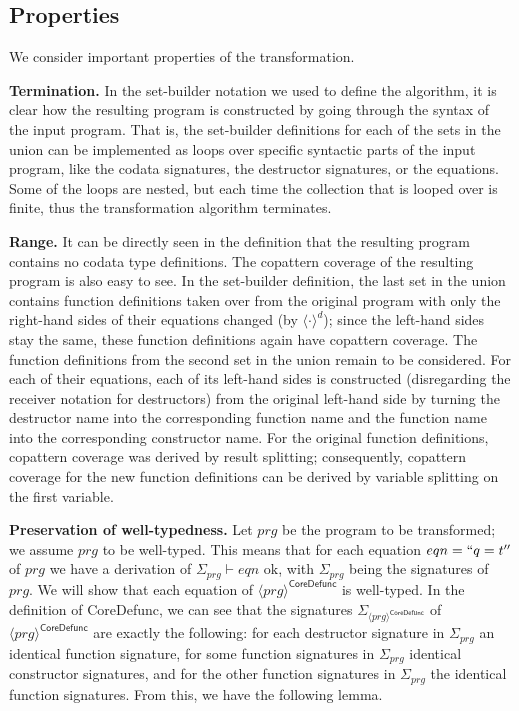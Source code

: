 \subsection{Properties}

We consider important properties of the transformation.

\textbf{Termination.} In the set-builder notation we used to define the algorithm, it is clear how the resulting program is constructed by going through the syntax of the input program. That is, the set-builder definitions for each of the sets in the union can be implemented as loops over specific syntactic parts of the input program, like the codata signatures, the destructor signatures, or the equations. Some of the loops are nested, but each time the collection that is looped over is finite, thus the transformation algorithm terminates.

\textbf{Range.} It can be directly seen in the definition that the resulting program contains no codata type definitions. The copattern coverage of the resulting program is also easy to see. In the set-builder definition, the last set in the union contains function definitions taken over from the original program with only the right-hand sides of their equations changed (by $\langle \cdot \rangle^d$); since the left-hand sides stay the same, these function definitions again have copattern coverage. The function definitions from the second set in the union remain to be considered. For each of their equations, each of its left-hand sides is constructed (disregarding the receiver notation for destructors) from the original left-hand side by turning the destructor name into the corresponding function name and the function name into the corresponding constructor name. For the original function definitions, copattern coverage was derived by result splitting; consequently, copattern coverage for the new function definitions can be derived by variable splitting on the first variable.

\textbf{Preservation of well-typedness.} Let $prg$ be the program to be transformed; we assume $prg$ to be well-typed. This means that for each equation $eqn = `` q = t ''$ of $prg$ we have a derivation of $\Sigma_{prg} \vdash eqn \textrm{ ok}$, with $\Sigma_{prg}$ being the signatures of $prg$. We will show that each equation of $\langle prg \rangle^{\textsf{CoreDefunc}}$ is well-typed. In the definition of \textsf{CoreDefunc}, we can see that the signatures $\Sigma_{\langle prg \rangle^{\textsf{CoreDefunc}}}$ of $\langle prg \rangle^{\textsf{CoreDefunc}}$ are exactly the following: for each destructor signature in $\Sigma_{prg}$ an identical function signature, for some function signatures in $\Sigma_{prg}$ identical constructor signatures, and for the other function signatures in $\Sigma_{prg}$ the identical function signatures. From this, we have the following lemma.

